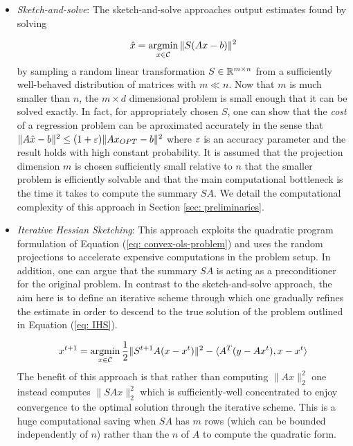 \begin{itemize}
  \item \textit{Sketch-and-solve}:
  The sketch-and-solve approaches output estimates found by solving

  \begin{equation}
    \hat{x} = \operatorname*{argmin}_{x \in \mathcal{C}} \| S(Ax - b) \|^2
  \end{equation}
  by sampling a random linear transformation $S \in \mathbb{R}^{m \times n}$ from a
  sufficiently well-behaved distribution of matrices with $m \ll n$.
  Now that $m$ is much smaller than $n$, the $m \times d$ dimensional problem
  is small enough that it can be solved exactly.
  In fact, for appropriately chosen $S$, one can show that the \textit{
  cost} of a regression problem can be aproximated accurately in the sense
  that $\| A  \hat{x} - b \|^2 \le (1 + \varepsilon) \|A x_{OPT} - b\|^2$ where
  $\varepsilon$ is an accuracy parameter and the result holds with high constant
  probability.
  It is assumed that the projection dimension $m$ is chosen sufficiently small
  relative to $n$ that the smaller problem is efficiently solvable and that
  the main computational bottleneck is the time it takes to compute the
  summary $SA$.
  We detail the computational complexity of this approach in Section
  \ref{sec: preliminaries}.

  \item \textit{Iterative Hessian Sketching}:
  This approach exploits the quadratic program formulation of Equation
  (\ref{eq: convex-ols-problem}) and uses the random projections to accelerate
  expensive computations in the problem setup.
  In addition, one can argue that the summary $SA$ is acting as a preconditioner
  for the original problem.
  In contrast to the sketch-and-solve approach, the aim here is to define an
  iterative scheme through which one gradually refines the estimate in order
  to descend to the true solution of the problem outlined in Equation (\ref{eq: IHS}).

  \begin{equation} \label{eq: IHS}
    x^{t+1} = \operatorname*{argmin}_{x \in \mathcal{C}}  \frac{1}{2} \|S^{t+1} A
    (x - x^t) \|^2 - \langle A^T (y - Ax^t), x - x^t \rangle
  \end{equation}
  The benefit of this approach is that rather than computing $\|Ax\|_2^2$ one
  instead computes $\| SAx \|_2^2$ which is sufficiently-well concentrated to enjoy
  convergence to the optimal solution through the iterative scheme.
  This is a huge computational saving when $SA$ has $m$ rows (which can be bounded
  independently of $n$) rather than the $n$ of $A$ to compute the quadratic form.

\end{itemize}

